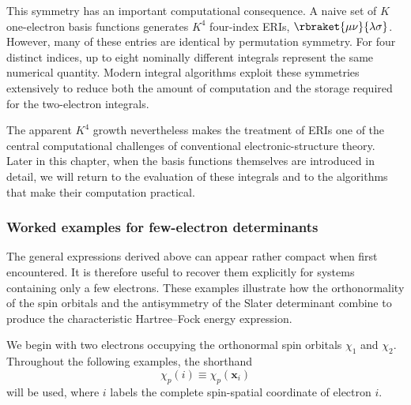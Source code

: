 \documentclass[11pt,a4paper,titlepage]{article}
\numberwithin{equation}{section}
\newcommand{\bx}{\boldsymbol{x}}
\begin{document}
This symmetry has an important computational consequence. A naive set of
$K$ one-electron basis functions generates $K^4$ four-index ERIs, $\rbraket{\mu\nu}{\lambda\sigma}$.
However, many of these entries are identical by permutation symmetry.
For four distinct indices, up to eight nominally different integrals
represent the same numerical quantity. Modern integral algorithms exploit
these symmetries extensively to reduce both the amount of computation and
the storage required for the two-electron integrals.

The apparent $K^4$ growth nevertheless makes the treatment of ERIs one of
the central computational challenges of conventional electronic-structure
theory. Later in this chapter, when the basis functions themselves are
introduced in detail, we will return to the evaluation of these integrals
and to the algorithms that make their computation practical.

\subsubsection{Worked examples for few-electron determinants}

The general expressions derived above can appear rather compact when first
encountered. It is therefore useful to recover them explicitly for systems
containing only a few electrons. These examples illustrate how the
orthonormality of the spin orbitals and the antisymmetry of the Slater
determinant combine to produce the characteristic Hartree--Fock energy
expression.

We begin with two electrons occupying the orthonormal spin orbitals
$\chi_1$ and $\chi_2$. Throughout the following examples, the shorthand
\begin{equation}
  \chi_p(i)\equiv\chi_p(\bx_i)
\end{equation}
will be used, where $i$ labels the complete spin-spatial coordinate of
electron $i$.

\end{document}
